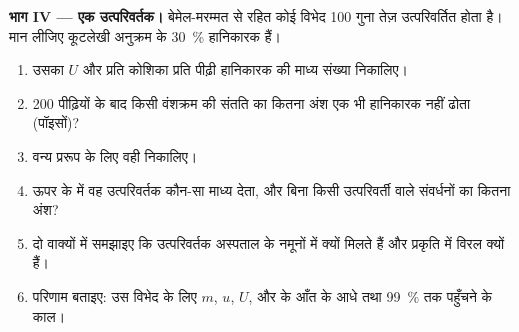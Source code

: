 \begin{problem}
\medskip
\noindent\textbf{भाग IV --- एक उत्परिवर्तक।}
बेमेल-मरम्मत से रहित कोई विभेद \num{100} गुना तेज़ उत्परिवर्तित होता है।
मान लीजिए कूटलेखी अनुक्रम के \qty{30}{\%}  हानिकारक हैं।
\begin{enumerate}[resume]
  \item उसका $U$ और प्रति कोशिका प्रति पीढ़ी हानिकारक  की
        माध्य संख्या निकालिए।
  \item \num{200} पीढ़ियों के बाद किसी वंशक्रम की संतति का कितना अंश
        एक भी हानिकारक  नहीं ढोता (पॉइसों)?
  \item वन्य प्ररूप के लिए वही निकालिए।
  \item ऊपर के  में वह उत्परिवर्तक कौन-सा माध्य
        देता, और बिना किसी उत्परिवर्ती वाले संवर्धनों का कितना अंश?
  \item दो वाक्यों में समझाइए कि उत्परिवर्तक अस्पताल के नमूनों में
        क्यों मिलते हैं और प्रकृति में विरल क्यों हैं।
  \item परिणाम बताइए: उस विभेद के लिए $m$, $u$, $U$, और 
        के आँत के आधे तथा \qty{99}{\%} तक पहुँचने के काल।
\end{enumerate}
\end{problem}

